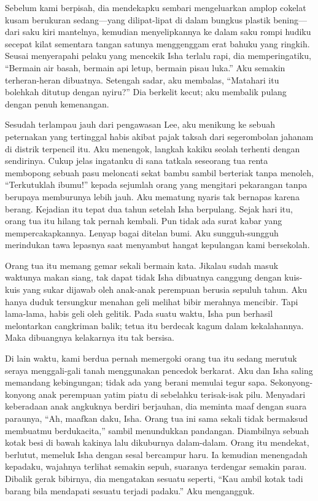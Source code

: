 \documentclass[smalldemyvopaper,11pt,twoside,onecolumn,openright,extrafontsizes]{memoir}
\begin{document}
Sebelum kami berpisah, dia mendekapku sembari mengeluarkan amplop cokelat kusam berukuran sedang---yang dilipat-lipat di dalam bungkus plastik bening---dari saku kiri mantelnya, kemudian menyelipkannya ke dalam saku rompi hudiku secepat kilat sementara tangan satunya menggenggam erat bahuku yang ringkih. Seusai menyerapahi pelaku yang mencekik Isha terlalu rapi, dia memperingatiku, ``Bermain air basah, bermain api letup, bermain pisau luka.'' Aku semakin terheran-heran dibuatnya. Setengah sadar, aku membalas, ``Matahari itu bolehkah ditutup dengan nyiru?'' Dia berkelit kecut; aku membalik pulang dengan penuh kemenangan.


Sesudah terlampau jauh dari pengawasan Lee, aku menikung ke sebuah peternakan yang tertinggal habis akibat pajak taksah dari segerombolan jahanam di distrik terpencil itu. Aku menengok, langkah kakiku seolah terhenti dengan sendirinya. Cukup jelas ingatanku di sana tatkala seseorang tua renta membopong sebuah pasu meloncati sekat bambu sambil berteriak tanpa menoleh, ``Terkutuklah ibumu!'' kepada sejumlah orang yang mengitari pekarangan tanpa berupaya memburunya lebih jauh. Aku mematung nyaris tak bernapas karena berang. Kejadian itu tepat dua tahun setelah Isha berpulang. Sejak hari itu, orang tua itu hilang tak pernah kembali. Pun tidak ada surat kabar yang  mempercakapkannya. Lenyap bagai ditelan bumi. Aku sungguh-sungguh merindukan tawa lepasnya saat menyambut hangat kepulangan kami bersekolah.

Orang tua itu memang gemar sekali bermain kata. Jikalau sudah masuk waktunya makan siang, tak dapat tidak Isha dibuatnya canggung dengan kuis-kuis yang sukar dijawab oleh anak-anak perempuan berusia sepuluh tahun. Aku hanya duduk tersungkur menahan geli melihat bibir merahnya mencibir. Tapi lama-lama, habis geli oleh gelitik. Pada suatu waktu, Isha pun berhasil melontarkan cangkriman balik; tetua itu berdecak kagum dalam kekalahannya. Maka dibuangnya kelakarnya itu tak bersisa.

Di lain waktu, kami berdua pernah memergoki orang tua itu sedang merutuk seraya menggali-gali tanah menggunakan pencedok berkarat. Aku dan Isha saling memandang kebingungan; tidak ada yang berani memulai tegur sapa. Sekonyong-konyong anak perempuan yatim piatu di sebelahku terisak-isak pilu. Menyadari keberadaan anak angkuknya berdiri berjauhan, dia meminta maaf dengan suara paraunya, ``Ah, maafkan daku, Isha. Orang tua ini sama sekali tidak bermaksud membuatmu berdukacita,'' sambil menundukkan pandangan. Diambilnya sebuah kotak besi di bawah kakinya lalu dikuburnya dalam-dalam. Orang itu mendekat, berlutut, memeluk Isha dengan sesal bercampur haru. Ia kemudian menengadah kepadaku, wajahnya terlihat semakin sepuh, suaranya terdengar semakin parau. Dibalik gerak bibirnya, dia mengatakan sesuatu seperti, ``Kau ambil kotak tadi barang bila mendapati sesuatu terjadi padaku.'' Aku mengangguk.
\end{document}
